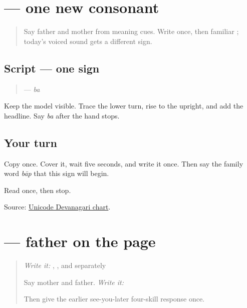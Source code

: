 \section[\texorpdfstring{\mw{ब} (ba)}{ब (ba)}]{ — one new consonant}

\label{lesson:MW-W08-ba}



\begin{quote}
Say father and mother from meaning cues. Write \textbf{ } once, then familiar \textbf{}; today's voiced sound gets a different sign.
\end{quote}

\subsection*{Script — one sign}

\begin{quote}
\textbf{} — \emph{ba}
\end{quote}

Keep the model visible. Trace the lower turn, rise to the upright, and add the headline. Say \emph{ba} after the hand stops.

\subsection*{Your turn}
Copy \textbf{} once. Cover it, wait five seconds, and write it once. Then say the family word \emph{bāp} that this sign will begin.

\begin{tcolorbox}[breakable,colback=teal!4,colframe=teal!35!black,title={Before you move on}]
Read \textbf{} once, then stop.

Source: \href{https://www.unicode.org/charts/PDF/U0900.pdf}{Unicode Devanagari chart}.
\end{tcolorbox}
\section[\texorpdfstring{\mw{बाप} (bāp)}{बाप (bāp)}]{ — father on the page}

\label{lesson:MW-C08-baap}



\begin{quote}
\emph{Write it:} \textbf{}, \textbf{}, and \textbf{} separately

Say mother and father. \emph{Write it:} \textbf{}

Then give the earlier see-you-later four-skill response once.
\end{quote}

